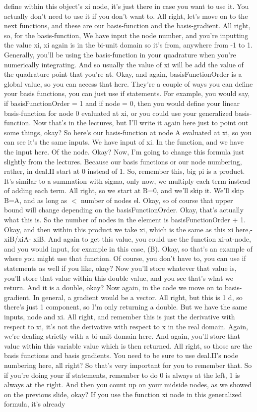\documentclass[10pt]{article}
\begin{document}
define within this object's xi node, it's just there in case you want to use it. You actually don't need to use it if you don't want to. All right, let's move on to the next functions, and these are our basis-function and the basis-gradient. All right, so, for the basis-function, We have input the node number, and you're inputting the value xi, xi again is in the bi-unit domain so it's from, anywhere from -1 to 1. Generally, you'll be using the basis-function in your quadrature when you're numerically integrating. And so usually the value of xi will be add the value of the quadrature point that you're at. Okay, and again, basisFunctionOrder is a global value, so you can access that here. They're a couple of ways you can define your basis functions, you can just use if statements. For example, you would say, if basisFunctionOrder = 1 and if node = 0, then you would define your linear basis-function for node 0 evaluated at xi, or you could use your generalized basis-function. Now that's in the lectures, but I'll write it again here just to point out some things, okay? So here's our basis-function at node A evaluated at xi, so you can see it's the same inputs. We have input of xi. In the function, and we have the input here. Of the node. Okay? Now, I'm going to change this formula just slightly from the lectures. Because our basis functions or our node numbering, rather, in deal.II start at 0 instead of 1. So, remember this, big pi is a product. It's similar to a summation with sigma, only now, we multiply each term instead of adding each term. All right, so we start at B=0, and we'll skip it. We'll skip B=A, and as long as $<$ number of  nodes el. Okay, so of course that upper bound will change depending on the basisFunctionOrder. Okay, that's actually what this is. So the number of nodes in the element is basisFunctionOrder + 1. Okay, and then within this product we take xi, which is the same as this xi here,- xiB/xiA- xiB. And again to get this value, you could use the function xi-at-node, and you would input, for example in this case, (B). Okay, so that's an example of where you might use that function. Of course, you don't have to, you can use if statements as well if you like, okay? Now you'll store whatever that value is, you'll store that value within this double value, and you see that's what we return. And it is a double, okay? Now again, in the code we move on to basis-gradient. In general, a gradient would be a vector. All right, but this is 1 d, so there's just 1 component, so I'm only returning a double. But we have the same inputs, node and xi. All right, and remember this is just the derivative with respect to xi, it's not the derivative with respect to x in the real domain. Again, we're dealing strictly with a bi-unit domain here. And again, you'll store that value within this variable value which is then returned. All right, so those are the basis functions and basis gradients. You need to be sure to use deal.II's node numbering here, all right? So that's very important for you to remember that. So if you're doing your if statements, remember to do 0 is always at the left, 1 is always at the right. And then you count up on your midside nodes, as we showed on the previous slide, okay? If you use the function xi node in this generalized formula, it's already 
\end{document}
